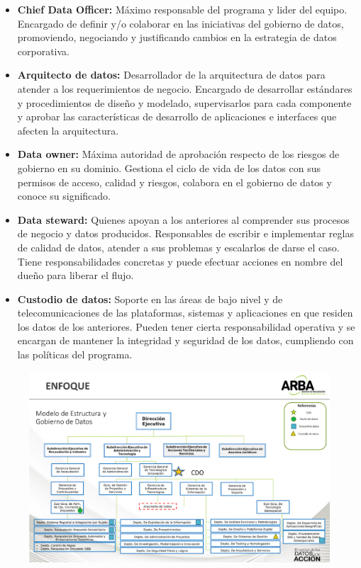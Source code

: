 \begin{itemize}
    \item \textbf{Chief Data Officer:} Máximo responsable del programa y lider del equipo. Encargado de definir y/o colaborar en las iniciativas del gobierno de datos, promoviendo, negociando y justificando cambios en la estrategia de datos corporativa.
    \item \textbf{Arquitecto de datos:} Desarrollador de la arquitectura de datos para atender a los requerimientos de negocio. Encargado de desarrollar estándares y procedimientos de diseño y modelado, supervisarlos para cada componente y aprobar las características de desarrollo de aplicaciones e interfaces que afecten la arquitectura.
    \item \textbf{Data owner:} Máxima autoridad de aprobación respecto de los riesgos de gobierno en su dominio. Gestiona el ciclo de vida de los datos con sus permisos de acceso, calidad y riesgos, colabora en el gobierno de datos y conoce su significado.
    \item \textbf{Data steward:} Quienes apoyan a los anteriores al comprender sus procesos de negocio y datos producidos. Responsables de escribir e implementar reglas de calidad de datos, atender a sus problemas y escalarlos de darse el caso. Tiene responsabilidades concretas y puede efectuar acciones en nombre del dueño para liberar el flujo.
    \item \textbf{Custodio de datos:} Soporte en las áreas de bajo nivel y de telecomunicaciones de las plataformas, sistemas y aplicaciones en que residen los datos de los anteriores. Pueden tener cierta responsabilidad operativa y se encargan de mantener la integridad y seguridad de los datos, cumpliendo con las políticas del programa.
\end{itemize}

\begin{figure}[H]
    \centering
    \includegraphics[scale=0.4]{fig/modelo-gobierno-de-datos.png}
\end{figure}

